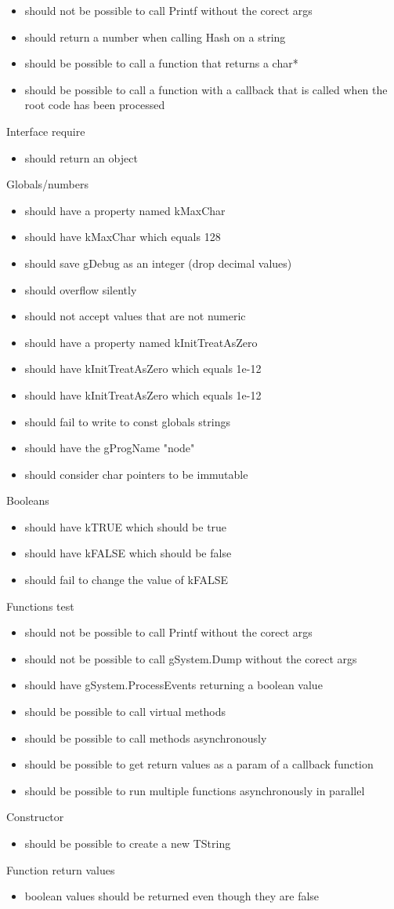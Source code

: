\begin{itemize}
\item should not be possible to call Printf without the corect args
\item should return a number when calling Hash on a string
\item should be possible to call a function that returns a char*
\item should be possible to call a function with a callback that is called when the root code has been processed
\end{itemize}
Interface require
\begin{itemize}
\item should return an object
\end{itemize}
Globals/numbers
\begin{itemize}
\item should have a property named kMaxChar
\item should have kMaxChar which equals 128
\item should save gDebug as an integer (drop decimal values)
\item should overflow silently
\item should not accept values that are not numeric
\item should have a property named kInitTreatAsZero
\item should have kInitTreatAsZero which equals 1e-12
\item should have kInitTreatAsZero which equals 1e-12
\item should fail to write to const globals strings
\item should have the gProgName "node"
\item should consider char pointers to be immutable
\end{itemize}
Booleans
\begin{itemize}
\item should have kTRUE which should be true
\item should have kFALSE which should be false
\item should fail to change the value of kFALSE
\end{itemize}
Functions test
\begin{itemize}
\item should not be possible to call Printf without the corect args
\item should not be possible to call gSystem.Dump without the corect args
\item should have gSystem.ProcessEvents returning a boolean value
\item should be possible to call virtual methods
\item should be possible to call methods asynchronously
\item should be possible to get return values as a param of a callback function
\item should be possible to run multiple functions asynchronously in parallel
\end{itemize}
Constructor
\begin{itemize}
\item should be possible to create a new TString
\end{itemize}
Function return values
\begin{itemize}
\item boolean values should be returned even though they are false
\end{itemize}
